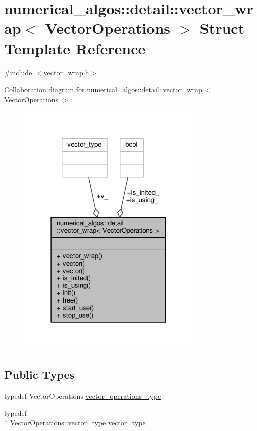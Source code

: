 \hypertarget{structnumerical__algos_1_1detail_1_1vector__wrap}{\section{numerical\-\_\-algos\-:\-:detail\-:\-:vector\-\_\-wrap$<$ Vector\-Operations $>$ Struct Template Reference}
\label{structnumerical__algos_1_1detail_1_1vector__wrap}
}


{\ttfamily \#include $<$vector\-\_\-wrap.\-h$>$}



Collaboration diagram for numerical\-\_\-algos\-:\-:detail\-:\-:vector\-\_\-wrap$<$ Vector\-Operations $>$\-:
\nopagebreak
\begin{figure}[H]
\begin{center}
\leavevmode
\includegraphics[width=250pt]{structnumerical__algos_1_1detail_1_1vector__wrap__coll__graph}
\end{center}
\end{figure}
\subsection*{Public Types}
\begin{DoxyCompactItemize}
\item 
typedef Vector\-Operations \hyperlink{structnumerical__algos_1_1detail_1_1vector__wrap_aec858386dcc9cf18fdedd2ab4a606217}{vector\-\_\-operations\-\_\-type}
\item 
typedef \\*
Vector\-Operations\-::vector\-\_\-type \hyperlink{structnumerical__algos_1_1detail_1_1vector__wrap_ad1b05447249f58553a35e12c23cb3e12}{vector\-\_\-type}
\end{DoxyCompactItemize}
